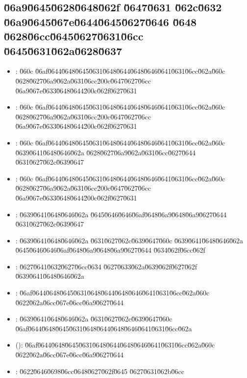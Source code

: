 \documentclass[12pt,a4paper]{article}
\begin{document}
\subsection*{\u06a9\u0645\u0628\u0648\u062f \u0647\u0631 \u062c\u0632 \u06a9\u0645\u067e\u0644\u0645\u0627\u0646 \u0648 \u0628\u06cc\u0645\u0627\u0631\u06cc \u0645\u0631\u062a\u0628\u0637}
\begin{itemize}
\item {}: \u060c \u06af\u0644\u0648\u0645\u0631\u0648\u0644\u0648\u0646\u0641\u0631\u06cc\u062a\u060c \u0628\u0627\u06a9\u062a\u0631\u06cc\u200c\u0647\u0627\u06cc \u06a9\u067e\u0633\u0648\u0644\u200c\u062f\u0627\u0631
\item {}: \u060c \u06af\u0644\u0648\u0645\u0631\u0648\u0644\u0648\u0646\u0641\u0631\u06cc\u062a\u060c \u0628\u0627\u06a9\u062a\u0631\u06cc\u200c\u0647\u0627\u06cc \u06a9\u067e\u0633\u0648\u0644\u200c\u062f\u0627\u0631
\item {}: \u060c \u06af\u0644\u0648\u0645\u0631\u0648\u0644\u0648\u0646\u0641\u0631\u06cc\u062a\u060c \u0639\u0641\u0648\u0646\u062a \u0628\u0627\u06a9\u062a\u0631\u06cc\u0627\u0644 \u0631\u0627\u062c\u0639\u0647
\item {}: \u060c \u06af\u0644\u0648\u0645\u0631\u0648\u0644\u0648\u0646\u0641\u0631\u06cc\u062a\u060c \u0628\u0627\u06a9\u062a\u0631\u06cc\u200c\u0647\u0627\u06cc \u06a9\u067e\u0633\u0648\u0644\u200c\u062f\u0627\u0631
\item {}: \u0639\u0641\u0648\u0646\u062a \u0645\u0646\u0646\u06af\u0648\u06a9\u0648\u06a9\u0627\u0644 \u0631\u0627\u062c\u0639\u0647
\item {}: \u0639\u0641\u0648\u0646\u062a \u0631\u0627\u062c\u0639\u0647\u060c \u0639\u0641\u0648\u0646\u062a \u0645\u0646\u0646\u06af\u0648\u06a9\u0648\u06a9\u0627\u0644 \u0634\u062f\u06cc\u062f
\item {}: \u0627\u0641\u0632\u0627\u06cc\u0634 \u0627\u0633\u062a\u0639\u062f\u0627\u062f \u0639\u0641\u0648\u0646\u062a
\item {}: \u06af\u0644\u0648\u0645\u0631\u0648\u0644\u0648\u0646\u0641\u0631\u06cc\u062a\u060c  \u0622\u062a\u06cc\u067e\u06cc\u06a9\u0627\u0644
\item {}: \u0639\u0641\u0648\u0646\u062a \u0631\u0627\u062c\u0639\u0647\u060c \u06af\u0644\u0648\u0645\u0631\u0648\u0644\u0648\u0646\u0641\u0631\u06cc\u062a
\item {} (): \u06af\u0644\u0648\u0645\u0631\u0648\u0644\u0648\u0646\u0641\u0631\u06cc\u062a\u060c  \u0622\u062a\u06cc\u067e\u06cc\u06a9\u0627\u0644
\item {}: \u0622\u0646\u0698\u06cc\u0648\u0627\u062f\u0645 \u0627\u0631\u062b\u06cc
\end{itemize}
\end{document}
